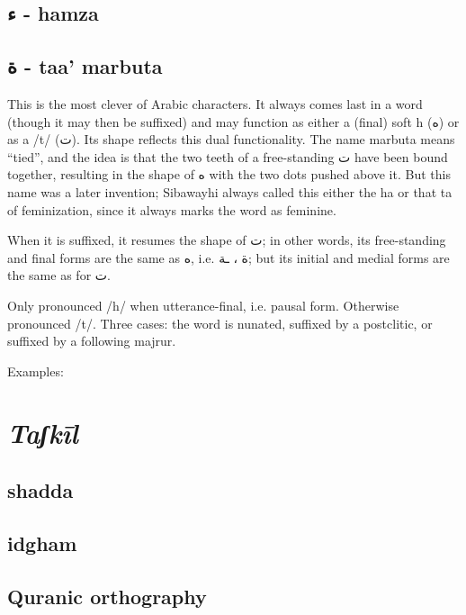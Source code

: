\documentclass[11pt]{article}
\begin{document}
\subsection{\textarabic{ء} - hamza}

\subsection{\textarabic{ة} - taa' marbuta}

This is the most clever of Arabic characters. It always comes last in
a word (though it may then be suffixed) and may function as either a
(final) soft h (\textarabic{ه}) or as a /t/ (\textarabic{ت}). Its
shape reflects this dual functionality. The name marbuta means
``tied'', and the idea is that the two teeth of a free-standing
\textarabic{ت} have been bound together, resulting in the shape of
\textarabic{ه} with the two dots pushed above it. But this name was a
later invention; Sibawayhi always called this either the ha or that ta
of feminization, since it always marks the word as feminine.

When it is suffixed, it resumes the shape of \textarabic{ت}; in other
words, its free-standing and final forms are the same as
\textarabic{ه}, i.e. \textarabic{ة ، ـة}; but its initial and medial
forms are the same as for \textarabic{ت}.

Only pronounced /h/ when utterance-final, i.e. pausal form. Otherwise
pronounced /t/. Three cases: the word is nunated, suffixed by a
postclitic, or suffixed by a following majrur.

Examples:

\section{\textit{Taʃkīl}}

\subsection{shadda}

\subsection{idgham}

\subsection{Quranic orthography}
\end{document}
